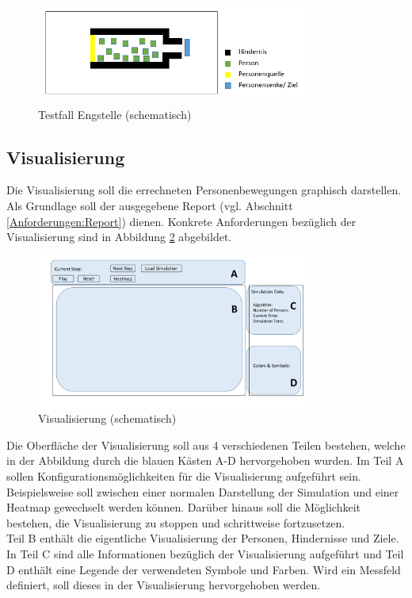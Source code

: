 \begin{figure}[htpb]
	\centering
	\includegraphics[width=0.8\textwidth]{abbildungen/Test_Engstelle.png}
	\caption{Testfall Engstelle (schematisch)}
	\label{fig:Engstelle}
\end{figure}

\subsection{Visualisierung}

Die Visualisierung soll die errechneten Personenbewegungen graphisch darstellen. Als Grundlage soll der ausgegebene Report (vgl. Abschnitt \ref{Anforderungen:Report}) dienen. Konkrete Anforderungen bezüglich der Visualisierung sind in Abbildung \ref{fig:AnforderungenVisualisierung} abgebildet.

\begin{figure}[htpb]
	\centering
	\includegraphics[width=0.8\textwidth]{abbildungen/AnforderungenVisualisierung.pdf}
	\caption{Visualisierung (schematisch)}
	\label{fig:AnforderungenVisualisierung}
\end{figure}

Die Oberfläche der Visualisierung soll aus 4 verschiedenen Teilen bestehen, welche in der Abbildung durch die blauen Kästen A-D hervorgehoben wurden. Im Teil A sollen Konfigurationsmöglichkeiten für die Visualisierung aufgeführt sein. Beispielsweise soll zwischen einer normalen Darstellung der Simulation und einer Heatmap gewechselt werden können. Darüber hinaus soll die Möglichkeit bestehen, die Visualisierung zu stoppen und schrittweise fortzusetzen. \\
Teil B enthält die eigentliche Visualisierung der Personen, Hindernisse und Ziele. In Teil C sind alle Informationen bezüglich der Visualisierung aufgeführt und Teil D enthält eine Legende der verwendeten Symbole und Farben. Wird ein Messfeld definiert, soll dieses in der Visualisierung hervorgehoben werden.



